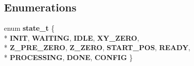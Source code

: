 \subsection*{Enumerations}
\begin{DoxyCompactItemize}
\item 
enum {\bfseries state\-\_\-t} \{ \\*
{\bfseries I\-N\-I\-T}, 
{\bfseries W\-A\-I\-T\-I\-N\-G}, 
{\bfseries I\-D\-L\-E}, 
{\bfseries X\-Y\-\_\-\-Z\-E\-R\-O}, 
\\*
{\bfseries Z\-\_\-\-P\-R\-E\-\_\-\-Z\-E\-R\-O}, 
{\bfseries Z\-\_\-\-Z\-E\-R\-O}, 
{\bfseries S\-T\-A\-R\-T\-\_\-\-P\-O\-S}, 
{\bfseries R\-E\-A\-D\-Y}, 
\\*
{\bfseries P\-R\-O\-C\-E\-S\-S\-I\-N\-G}, 
{\bfseries D\-O\-N\-E}, 
{\bfseries C\-O\-N\-F\-I\-G}
 \}
\end{DoxyCompactItemize}
